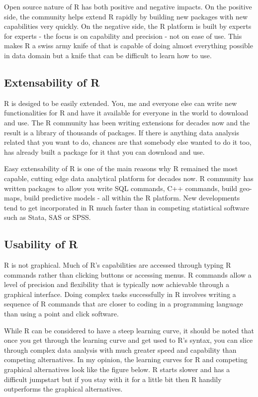 \documentclass[]{krantz}
\begin{document}
Open source nature of R has both positive and negative impacts. On the
positive side, the community helps extend R rapidly by building new
packages with new capabilities very quickly. On the negative side, the R
platform is built by experts for experts - the focus is on capability
and precision - not on ease of use. This makes R a swiss army knife of
that is capable of doing almost everything possible in data domain but a
knife that can be difficult to learn how to use.

\subsection{Extensability of R}\label{extensability-of-r}

R is desiged to be easily extended. You, me and everyone else can write
new functionalities for R and have it available for everyone in the
world to download and use. The R community has been writing extensions
for decades now and the result is a library of thousands of packages. If
there is anything data analysis related that you want to do, chances are
that somebody else wanted to do it too, has already built a package for
it that you can download and use.

Easy extensability of R is one of the main reasons why R remained the
most capable, cutting edge data analytical platform for decades now. R
community has written packages to allow you write SQL commands, C++
commands, build geo-maps, build predictive models - all within the R
platform. New developments tend to get incorporated in R much faster
than in competing statistical software such as Stata, SAS or SPSS.

\subsection{Usability of R}\label{usability-of-r}

R is not graphical. Much of R's capabilities are accessed through typing
R commands rather than clicking buttons or accessing menus. R commands
allow a level of precision and flexibility that is typically now
achievable through a graphical interface. Doing complex tasks
successfully in R involves writing a sequence of R commands that are
closer to coding in a programming language than using a point and click
software.

While R can be considered to have a steep learning curve, it should be
noted that once you get through the learning curve and get used to R's
syntax, you can slice through complex data analysis with much greater
speed and capability than competing alternatives. In my opinion, the
learning curves for R and competing graphical alternatives look like the
figure below. R starts slower and has a difficult jumpstart but if you
stay with it for a little bit then R handily outperforms the graphical
alternatives.
\end{document}
